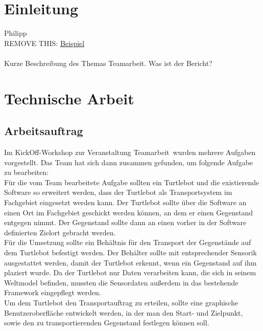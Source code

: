\documentclass[a4paper,12pt,headsepline]{scrartcl}
\begin{document}
	\tableofcontents
	\newpage
	
	\section{Einleitung}
		Philipp\\
		REMOVE THIS: \href{https://docs.google.com/document/d/1wGlFley6lwhnpLsj8ms7M6fnOjplazlHNr8Bfbv3vso/edit}{Beispiel}\\\\
		Kurze Beschreibung des Themas Teamarbeit. Was ist der Bericht?
	\newpage
	\section{Technische Arbeit}
	
	\subsection{Arbeitsauftrag}
		Im KickOff-Workshop zur Veranstaltung \glqq Teamarbeit\grqq\ wurden mehrere Aufgaben vorgestellt. Das Team hat sich dann zusammen gefunden, um folgende Aufgabe zu bearbeiten: \\
		Für die vom Team bearbeitete Aufgabe sollten ein Turtlebot und die existierende Software so erweitert werden, dass der Turtlebot als Transportsystem im Fachgebiet eingesetzt werden kann. Der Turtlebot sollte über die Software an einen Ort im Fachgebiet geschickt werden können, an dem er einen Gegenstand entgegen nimmt. Der Gegenstand sollte dann an einen vorher in der Software definierten Zielort gebracht werden. \\
		Für die Umsetzung sollte ein Behältnis  für den Transport der Gegenstände auf dem Turtlebot befestigt werden. Der Behälter sollte mit entsprechender Sensorik ausgestattet werden, damit der Turtlebot erkennt, wenn ein Gegenstand auf ihm plaziert wurde. Da der Turtlebot nur Daten verarbeiten kann, die sich in seinem Weltmodel befinden, mussten die Sensordaten außerdem in das bestehende Framework eingepflegt werden.\\
		Um dem Turtlebot den Transportauftrag zu erteilen, sollte eine graphische Benutzeroberfläche entwickelt werden, in der man den Start- und Zielpunkt, sowie den zu transportierenden Gegenstand festlegen können soll.  

		
	
\end{document}
